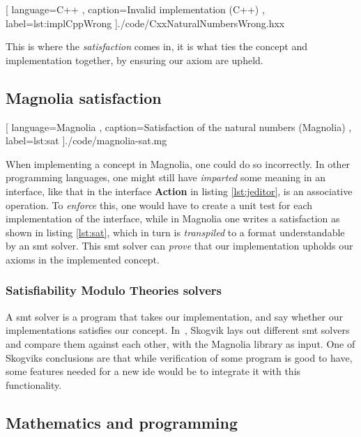 \begin{code}[H]
  
    [ language=C++
    , caption={Invalid implementation (C++)}
    , label=lst:implCppWrong
    ]{./code/CxxNaturalNumbersWrong.hxx}
\end{code}

This is where the
\textit{satisfaction} comes in, it is what ties the concept and implementation
together, by ensuring our axiom are upheld.

\subsection{Magnolia satisfaction}

\begin{center}
  
    [ language=Magnolia
    , caption={Satisfaction of the natural numbers (Magnolia)}
    , label=lst:sat
    ]{./code/magnolia-sat.mg}
\end{center}

When implementing a concept in Magnolia, one could do so incorrectly. In other
programming languages, one might still have \textit{imparted} some meaning in an
interface, like that in the interface \textbf{Action} in listing
\ref{lst:jeditor}, is an associative operation. To \textit{enforce} this, one
would have to create a unit test for each implementation of the interface, while
in Magnolia one writes a satisfaction as shown in listing \ref{lst:sat}, which
in turn is \textit{transpiled} to a format understandable by an \gls*{smt}
solver. This \gls*{smt} solver can \textit{prove} that our implementation upholds
our axioms in the implemented concept.

\subsubsection{Satisfiability Modulo Theories solvers}

A \gls*{smt} solver is a program that takes our implementation, and say whether
our implementations satisfies our concept. In~\cite{beateVerification}, Skogvik
lays out different \gls*{smt} solvers and compare them against each other, with
the Magnolia library as input. One of Skogviks conclusions are that while
verification of some program is good to have, some features needed for a new
\gls*{ide} would be to integrate it with this functionality.


\subsection{Mathematics and programming}

